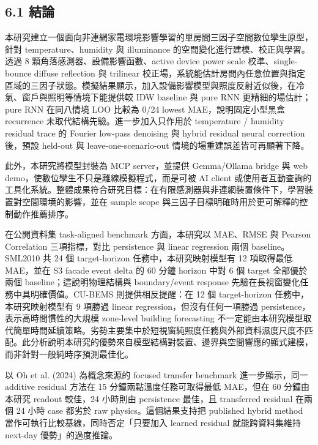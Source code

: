 \documentclass[12pt,a4paper]{article}
\begin{document}
\subsection*{6.1 結論}

本研究建立一個面向非連網家電環境影響學習的單房間三因子空間數位孿生原型，針對 temperature、humidity 與 illuminance 的空間變化進行建模、校正與學習。透過 8 顆角落感測器、設備影響函數、active device power scale 校準、single-bounce diffuse reflection 與 trilinear 校正場，系統能估計房間內任意位置與指定區域的三因子狀態。模擬結果顯示，加入設備影響模型與照度反射近似後，在冷氣、窗戶與照明等情境下能提供較 IDW baseline 與 pure RNN 更精細的場估計；pure RNN 在同八情境 LOO 比較為 0/24 lowest MAE，說明固定小型黑盒 recurrence 未取代結構先驗。進一步加入只作用於 temperature / humidity residual trace 的 Fourier low-pass denoising 與 hybrid residual neural correction 後，預設 held-out 與 leave-one-scenario-out 情境的場重建誤差皆可再顯著下降。


此外，本研究將模型封裝為 MCP server，並提供 Gemma/Ollama bridge 與 web demo，使數位孿生不只是離線模擬程式，而是可被 AI client 或使用者互動查詢的工具化系統。整體成果符合研究目標：在有限感測器與非連網裝置條件下，學習裝置對空間環境的影響，並在 sample scope 與三因子目標明確時用於更可解釋的控制動作推薦排序。


在公開資料集 task-aligned benchmark 方面，本研究以 MAE、RMSE 與 Pearson Correlation 三項指標，對比 persistence 與 linear regression 兩個 baseline。SML2010 共 24 個 target-horizon 任務中，本研究映射模型有 12 項取得最低 MAE，並在 S3 facade event delta 的 60 分鐘 horizon 中對 6 個 target 全部優於兩個 baseline；這說明物理結構與 boundary/event response 先驗在長視窗變化任務中具明確價值。CU-BEMS 則提供相反提醒：在 12 個 target-horizon 任務中，本研究映射模型有 9 項勝過 linear regression，但沒有任何一項勝過 persistence，表示高時間慣性的大規模 zone-level building forecasting 不一定能由本研究模型取代簡單時間延續策略。劣勢主要集中於短視窗純照度任務與外部資料濕度尺度不匹配。此分析說明本研究的優勢來自模型結構對裝置、邊界與空間響應的顯式建模，而非針對一般純時序預測最佳化。


以 Oh et al. (2024) 為概念來源的 focused transfer benchmark 進一步顯示，同一 additive residual 方法在 15 分鐘兩點溫度任務可取得最低 MAE，但在 60 分鐘由本研究 readout 較佳，24 小時則由 persistence 最佳，且 transferred residual 在兩個 24 小時 case 都劣於 raw physics。這個結果支持把 published hybrid method 當作可執行比較基線，同時否定「只要加入 learned residual 就能跨資料集維持 next-day 優勢」的過度推論。
\end{document}
